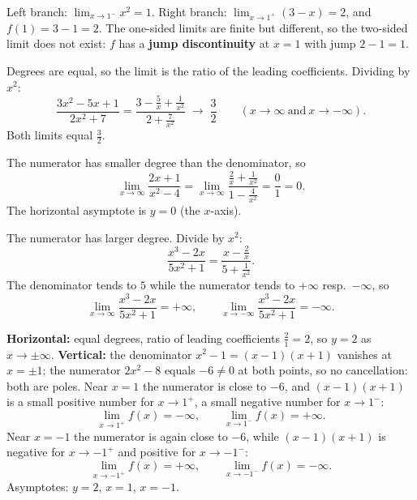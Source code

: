 \begin{solutions}
  \item Left branch: $\lim_{x\to 1^{-}}x^{2}=1$. Right branch:
        $\lim_{x\to 1^{+}}(3-x)=2$, and $f(1)=3-1=2$. The one-sided
        limits are finite but different, so the two-sided limit does not
        exist: $f$ has a \textbf{jump discontinuity} at $x=1$ with jump
        $2-1=1$.

  \item Degrees are equal, so the limit is the ratio of the leading
        coefficients. Dividing by $x^{2}$:
        \[
          \frac{3x^{2}-5x+1}{2x^{2}+7}
          =\frac{3-\frac{5}{x}+\frac{1}{x^{2}}}{2+\frac{7}{x^{2}}}
          \;\longrightarrow\;\frac{3}{2}
          \qquad (x\to\infty\ \text{and}\ x\to-\infty).
        \]
        Both limits equal $\tfrac{3}{2}$.

  \item The numerator has smaller degree than the denominator, so
        \[
          \lim_{x\to\infty}\frac{2x+1}{x^{2}-4}
          =\lim_{x\to\infty}
           \frac{\frac{2}{x}+\frac{1}{x^{2}}}{1-\frac{4}{x^{2}}}
          =\frac{0}{1}=0 .
        \]
        The horizontal asymptote is $y=0$ (the $x$-axis).

  \item The numerator has larger degree. Divide by $x^{2}$:
        \[
          \frac{x^{3}-2x}{5x^{2}+1}
          =\frac{x-\frac{2}{x}}{5+\frac{1}{x^{2}}} .
        \]
        The denominator tends to $5$ while the numerator tends to
        $+\infty$ resp.\ $-\infty$, so
        \[
          \lim_{x\to\infty}\frac{x^{3}-2x}{5x^{2}+1}=+\infty,
          \qquad
          \lim_{x\to-\infty}\frac{x^{3}-2x}{5x^{2}+1}=-\infty .
        \]

  \item \textbf{Horizontal:} equal degrees, ratio of leading
        coefficients $\tfrac{2}{1}=2$, so $y=2$ as $x\to\pm\infty$.
        \textbf{Vertical:} the denominator $x^{2}-1=(x-1)(x+1)$
        vanishes at $x=\pm 1$; the numerator $2x^{2}-8$ equals $-6\neq 0$
        at both points, so no cancellation: both are poles. Near $x=1$
        the numerator is close to $-6$, and $(x-1)(x+1)$ is a small
        positive number for $x\to 1^{+}$, a small negative number for
        $x\to 1^{-}$:
        \[
          \lim_{x\to 1^{+}}f(x)=-\infty,\qquad
          \lim_{x\to 1^{-}}f(x)=+\infty .
        \]
        Near $x=-1$ the numerator is again close to $-6$, while
        $(x-1)(x+1)$ is negative for $x\to-1^{+}$ and positive for
        $x\to-1^{-}$:
        \[
          \lim_{x\to -1^{+}}f(x)=+\infty,\qquad
          \lim_{x\to -1^{-}}f(x)=-\infty .
        \]
        Asymptotes: $y=2$, $x=1$, $x=-1$.


\end{solutions}
